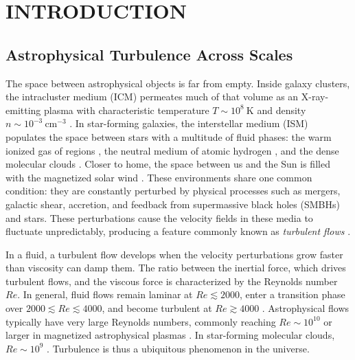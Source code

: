 \chapter{\texorpdfstring{\MakeUppercase{Introduction}}{Introduction}} \label{chap:intro}

\section{Astrophysical Turbulence Across Scales}

The space between astrophysical objects is far from empty.
Inside galaxy clusters, the intracluster medium (ICM) permeates much of that volume as an X-ray-emitting plasma with characteristic temperature $T \sim 10^8\ \mathrm{K}$ and density $n \sim 10^{-3}\ \mathrm{cm^{-3}}$ \citep[e.g.,][]{fabian_subsonic_1977,sarazin_x-ray_1986}.
In star-forming galaxies, the interstellar medium (ISM) populates the space between stars with a multitude of fluid phases: the warm ionized gas of  regions \citep{spitzer_physical_1978,osterbrock_astrophysics_1989}, the neutral medium of atomic hydrogen \citep{field_cosmic-ray_1969,dickey_hi_1990}, and the dense molecular clouds \citep{larson_turbulence_1981}.
Closer to home, the space between us and the Sun is filled with the magnetized solar wind \citep{parker_dynamics_1958,hundhausen_coronal_1972,schwenn_large-scale_1990}.
These environments share one common condition: they are constantly perturbed by physical processes such as mergers, galactic shear, accretion, and feedback from supermassive black holes (SMBHs) and stars.
These perturbations cause the velocity fields in these media to fluctuate unpredictably, producing a feature commonly known as \textit{turbulent flows} \citep{pope_turbulent_2000}.

In a fluid, a turbulent flow develops when the velocity perturbations grow faster than viscosity can damp them.
The ratio between the inertial force, which drives turbulent flows, and the viscous force is characterized by the Reynolds number $Re$.
In general, fluid flows remain laminar at $Re \lesssim 2000$, enter a transition phase over $2000 \lesssim Re \lesssim 4000$, and become turbulent at $Re \gtrsim 4000$ \citep{leishman_introduction_2026}.
Astrophysical flows typically have very large Reynolds numbers, commonly reaching
$Re \sim 10^{10}$ or larger in magnetized astrophysical plasmas
\citep{beresnyak_mhd_2019}. In star-forming molecular clouds, $Re \sim 10^9$ \citep{krumholz_notes_2015}.
Turbulence is thus a ubiquitous phenomenon in the universe.

